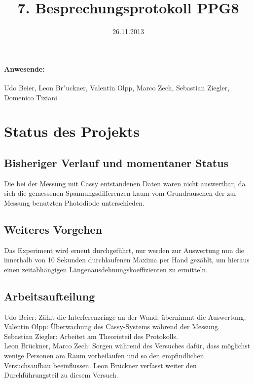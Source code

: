 \usepackage{array}

\usepackage{booktabs}

\usepackage[T1]{fontenc}
\usepackage{lmodern}
\usepackage{microtype}
\usepackage{circuitikz}
\newcommand{\wichtig}[1]{\underline{\large{#1}}}
\newcommand{\aref}[1]{(s.Abb. \ref{#1})}
\newcommand{\R}{\mathbb{R}}
\newcommand{\K}{\mathbb{K}}
\newcommand{\C}{\mathbb{C}}



\title{7. Besprechungsprotokoll PPG8}
\date{26.11.2013}
\maketitle

\paragraph{Anwesende:}
Udo Beier, Leon Br"uckner, Valentin Olpp, Marco Zech, Sebastian Ziegler, Domenico Tiziani


\section{Status des Projekts}

\subsection{Bisheriger Verlauf und momentaner Status}
Die bei der Messung mit Cassy entstandenen Daten waren nicht auswertbar, da sich die gemessenen Spannungsdifferenzen kaum vom Grundrauschen der zur Messung benutzten Photodiode unterschieden.

\subsection{Weiteres Vorgehen}
Das Experiment wird erneut durchgeführt, nur werden zur Auswertung nun die innerhalb von 10 Sekunden durchlaufenen Maxima per Hand gezählt, um hieraus einen zeitabhängigen Längenausdehnungskoeffizienten zu ermitteln.

\subsection{Arbeitsaufteilung}
Udo Beier: Zählt die Interferenzringe an der Wand; übernimmt die Auswertung. \\
Valentin Olpp: Überwachung des Cassy-Systems während der Messung. \\
Sebastian Ziegler: Arbeitet am Theorieteil des Protokolls. \\
Leon Brückner, Marco Zech: Sorgen während des Versuches dafür, dass möglichst wenige Personen am Raum vorbeilaufen und so den empfindlichen Versuchsaufbau beeinflussen. Leon Brückner verfasst weiter den Durchführungsteil zu diesem Versuch. 

